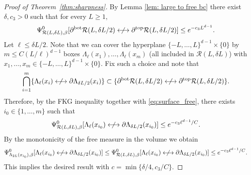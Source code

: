 \documentclass[11pt,a4paper]{article}
\numberwithin{equation}{section}
\theoremstyle{plain}
\theoremstyle{definition}
\begin{document}
\begin{proof}[Proof of Theorem~\textup{\ref{thm:sharpness}}]
By Lemma \ref{lem: large to free bc} there exist $\delta,c_3>0$ such that for every $L\geq 1$,
\begin{equation}\label{eq:surface_free}
\Psi^0_{\mathcal R(L,\delta L),\beta}[ \partial^{\mathrm{bot}} \mathcal R(L, \delta L/2) \centernot\longleftrightarrow \partial^{\mathrm {top}} \mathcal R(L, \delta L/2)] \leq e^{-c_3 L^{d-1}}.
\end{equation} Let $\ell\leq \delta L/2$. Note that we can cover the hyperplane $\{-L,\ldots,L\}^{d-1}\times \{0\}$ by $m\leq C({L}/{\ell})^{d-1}$ boxes $\Lambda_\ell(x_1),\ldots,\Lambda_\ell(x_m)$ (all included in $\mathcal{R}(L,\delta L)$) with $x_1,\ldots,x_m\in\{-L,\ldots,L\}^{d-1}\times \{0\}$. Fix such a choice and note that
\begin{equation}
\bigcap_{i=1}^{m} \{\Lambda_\ell(x_i)\centernot\longleftrightarrow\partial \Lambda_{\delta L/2}(x_i)\} \subset \{\partial^{\rm bot} \mathcal{R}(L, \delta L/2)\centernot\longleftrightarrow\partial^{\rm top} \mathcal{R}(L, \delta L/2)\}.
\end{equation}
Therefore, by the FKG inequality together with \eqref{eq:surface_free}, there exists $i_0\in\{1,\ldots,m\}$ such that 
\begin{equation} \label{eq: diff g}
\Psi^0_{\mathcal{R}(L,\delta L),\beta}[\Lambda_\ell(x_{i_0})\centernot\longleftrightarrow\partial \Lambda_{\delta L/2}(x_{i_0})]\leq e^{-c_3 \ell^{d-1}/C}.
\end{equation}
By the monotonicity of the free measure in the volume we obtain 
\begin{equation}
\Psi^0_{\Lambda_{2L}(x_{i_0}),\beta}[\Lambda_\ell(x_{i_0})\centernot\longleftrightarrow\partial \Lambda_{\delta L/2}(x_{i_0})]\leq \Psi^0_{\mathcal{R}(L,\delta L),\beta}[\Lambda_\ell(x_{i_0})\centernot\longleftrightarrow\partial \Lambda_{\delta L/2}(x_{i_0})]\leq e^{-c_3 \ell^{d-1}/C}.
\end{equation}
This implies the desired result with $c= \min\{\delta/4, c_3/C\}$.
\end{proof}




\end{document}
